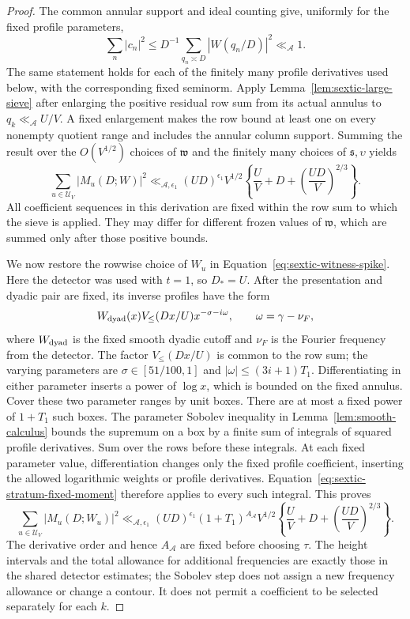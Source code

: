 \documentclass[11pt,a4paper]{article}
\numberwithin{equation}{section}
\numberwithin{figure}{section}
\theoremstyle{definition}
\theoremstyle{remark}
\begin{document}
\begin{proof}
The common annular support and ideal counting give, uniformly for the
fixed profile parameters,
\[
 \sum_n|c_n|^2
 \le D^{-1}\sum_{q_n\asymp D}|W(q_n/D)|^2\ll_{\mathcal A}1.
\]
The same statement holds for each of the finitely many profile derivatives
used below, with the corresponding fixed seminorm.  Apply
Lemma~\ref{lem:sextic-large-sieve} after enlarging the positive residual
row sum from its actual annulus to $q_k\ll_{\mathcal A}U/V$.  A fixed
enlargement makes the row bound at least one on every nonempty quotient
range and includes the annular column support.  Summing the
result over the $O(V^{1/2})$ choices of $\mathfrak w$ and the finitely
many choices of $\mathfrak s,\upsilon$ yields
\begin{equation}\label{eq:sextic-stratum-fixed-moment}
 \sum_{u\in\mathcal U_V}|M_u(D;W)|^2
 \ll_{\mathcal A,\epsilon_1}(UD)^{\epsilon_1}V^{1/2}
 \left\{\frac UV+D+\left(\frac{UD}{V}\right)^{2/3}\right\}.
\end{equation}
All coefficient sequences in this derivation are fixed within the row
sum to which the sieve is applied.  They may differ for different frozen
values of $\mathfrak w$, which are summed only after those positive bounds.

We now restore the rowwise choice of $W_u$ in
Equation~\eqref{eq:sextic-witness-spike}.  Here the detector was used with
$t=1$, so $D_*=U$.  After the presentation and dyadic pair are fixed, its
inverse profiles have the form
\[
 W_{\rm dyad}(x)V_{\le}(Dx/U)x^{-\sigma-i\omega},
 \qquad \omega=\gamma-\nu_F,
\]
where $W_{\rm dyad}$ is the fixed smooth dyadic cutoff and $\nu_F$ is
the Fourier frequency from the detector.
The factor $V_{\le}(Dx/U)$ is common to the row sum; the varying parameters
are $\sigma\in[51/100,1]$ and $|\omega|\le(3i+1)T_1$.
Differentiating in either parameter inserts a power of $\log x$, which is
bounded on the fixed annulus.  Cover these two parameter ranges by unit boxes.  There are at most a fixed power of
$1+T_1$ such boxes.  The parameter Sobolev inequality in
Lemma~\ref{lem:smooth-calculus} bounds the supremum on a box by a finite
sum of integrals of squared profile derivatives.  Sum over the rows before
these integrals.  At each fixed parameter value, differentiation changes
only the fixed profile coefficient, inserting the allowed logarithmic
weights or profile derivatives.  Equation~\eqref{eq:sextic-stratum-fixed-moment}
therefore applies to every such integral.  This proves
\begin{equation}\label{eq:sextic-stratum-moment}
 \sum_{u\in\mathcal U_V}|M_u(D;W_u)|^2
 \ll_{\mathcal A,\epsilon_1}(UD)^{\epsilon_1}(1+T_1)^{A_{\mathcal A}}
 V^{1/2}\left\{\frac UV+D+
       \left(\frac{UD}{V}\right)^{2/3}\right\}.
\end{equation}
The derivative order and hence $A_{\mathcal A}$ are fixed before choosing
$\tau$.  The height intervals and the total allowance for additional
frequencies are exactly those in the shared detector estimates; the
Sobolev step does not assign a new frequency allowance or change a contour.
It does not permit a coefficient to be selected separately for each $k$.


\end{proof}
\end{document}

